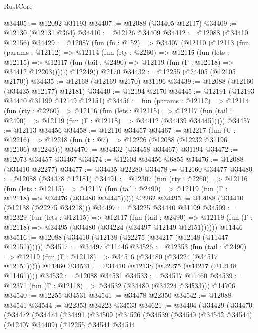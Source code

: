 \begin{lexlean}{RustCore}
\begin{coremodule}
@34405 := @12092 @31193
@34407 := @12088 (@34405 @12107)
@34409 := @12130 (@12131 @364)
@34410 := @12126 @34409
@34412 := @12088 (@34410 @12156)
@34429 := @12087
    (fun (fn : @152) =>
    @34407
      (@12110
        (@12113
          (fun (params : @12112) =>
          @12114
            (fun (rty : @2260) =>
            @12116
              (fun (lets : @12115) =>
              @12117 (fun (tail : @2490) => @12119 (fun (Γ : @12118) => @34412 @12203))))))
        @12249))
    @2170
@34432 := @12255 (@34405 (@12105 @2170))
@34435 := @12168 (@12169 @2170) @31196
@34439 := @12088 (@12160 (@34435 @12177) @12181)
@34440 := @12194 @2170
@34445 := @12191 (@12193 @34440 @31199 @12149 @12151)
@34456 := fun (params : @12112) =>
  @12114
    (fun (rty : @2260) =>
    @12116
      (fun (lets : @12115) =>
      @12117 (fun (tail : @2490) => @12119 (fun (Γ : @12118) => @34412 (@34439 @34445)))))
@34457 := @12113 @34456
@34458 := @12110 @34457
@34467 := @12217
    (fun (U : @12216) => @12218 (fun (t : @7) => @12226 (@12088 (@12232 @31196 @12106) @12243)))
@34470 := @34432 (@34458 @34467) @31194
@34472 := @12073 @34457 @34467
@34474 := @12304 @34456 @6855
@34476 := @12088 (@34410 @22277)
@34477 := @34435 @22280
@34478 := @12160 @34477
@34480 := @12088 (@34478 @12181)
@34491 := @12307
    (fun (rty : @2260) =>
    @12116
      (fun (lets : @12115) =>
      @12117 (fun (tail : @2490) => @12119 (fun (Γ : @12118) => @34476 (@34480 @34445)))))
    @2262
@34495 := @12088 (@34410 (@12138 (@22275 @34218)))
@34497 := @34225 @34440 @31199
@34509 := @12329
    (fun (lets : @12115) =>
    @12117
      (fun (tail : @2490) =>
      @12119 (fun (Γ : @12118) => @34495 (@34480 (@34224 (@34497 @12149 @12151))))))
    @11446
@34516 := @12088 (@34410 (@12138 (@22275 (@34217 (@12148 (@11447 @12151))))))
@34517 := @34497 @11446
@34526 := @12353
    (fun (tail : @2490) => @12119 (fun (Γ : @12118) => @34516 (@34480 (@34224 (@34517 @12151)))))
    @11460
@34531 := @34410 (@12138 (@22275 (@34217 (@12148 @11461))))
@34532 := @12088 @34531
@34533 := @34517 @11460
@34539 := @12371 (fun (Γ : @12118) => @34532 (@34480 (@34224 @34533))) @14706
@34540 := @12255 @34531
@34541 := @34478 @22350
@34542 := @12088 @34541
@34544 := @22353 @34223 @34533
@34621 := @34404
    (@34429
      (@34470
        (@34472
          (@34474
            (@34491
              (@34509
                (@34526
                  (@34539
                    (@34540
                      (@34542 @34544)
                      (@12407 @34409)
                      (@12255
                        @34541
                        @34544

\end{coremodule}
\end{lexlean}
